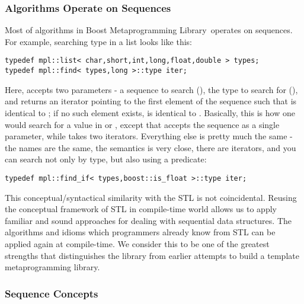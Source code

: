 \documentclass{kapproc}
\newcommand{\Mpl}{Boost Meta\-pro\-gram\-ming Library}
\begin{document}
\subsubsection{Algorithms Operate on Sequences}
  
Most of algorithms in \Mpl\ operates on sequences. For example, 
searching type in a list looks like this:

{\small
\begin{codesamp}\begin{verbatim}
typedef mpl::list< char,short,int,long,float,double > types;
typedef mpl::find< types,long >::type iter;
\end{verbatim}
\end{codesamp}
}

Here,  accepts two parameters - a sequence to search
(), the type to search for (), and returns an
iterator  pointing to the first element of the sequence
such that  is identical to ; if no such
element exists,  is identical to
. Basically, this is how one would search for a
value in  or , except that
 accepts the sequence as a single parameter,
while  takes two iterators.  Everything else is pretty
much the same - the names are the same, the semantics is very close,
there are iterators, and you can search not only by type, but also
using a predicate:

{\small
\begin{codesamp}\begin{verbatim}
typedef mpl::find_if< types,boost::is_float >::type iter;
\end{verbatim}
\end{codesamp}
}

This conceptual/syntactical similarity with the STL is not
coincidental. Reusing the conceptual framework of STL in compile-time
world allows us to apply familiar and sound approaches for dealing
with sequential data structures. The algorithms and idioms which
programmers already know from STL can be applied again at
compile-time. We consider this to be one of the greatest strengths
that distinguishes the library from earlier attempts to build a
template metaprogramming library.

\subsubsection{Sequence Concepts}
\end{document}
